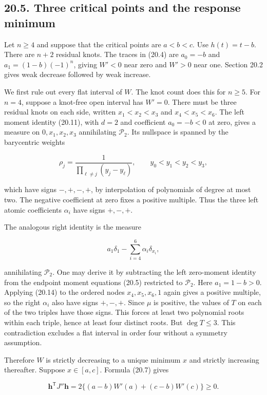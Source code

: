 \documentclass[11pt]{article}
\begin{document}
\subsection{20.5. Three critical points and the response
minimum}\label{three-critical-points-and-the-response-minimum}

Let \(n\ge4\) and suppose that the critical points are \(a<b<c\). Use
\(h(t)=t-b\). There are \(n+2\) residual knots. The traces in (20.4) are
\(a_0=-b\) and \(a_1=(1-b)(-1)^n\), giving \(W'<0\) near zero and
\(W'>0\) near one. Section 20.2 gives weak decrease followed by weak
increase.

We first rule out every flat interval of \(W\). The knot count does this
for \(n\ge5\). For \(n=4\), suppose a knot-free open interval has
\(W'=0\). There must be three residual knots on each side, written
\(x_1<x_2<x_3\) and \(x_4<x_5<x_6\). The left moment identity (20.11),
with \(d=2\) and coefficient \(a_0=-b<0\) at zero, gives a measure on
\(0,x_1,x_2,x_3\) annihilating \(\mathcal P_2\). Its nullspace is
spanned by the barycentric weights

\[
\rho_j=\frac1{\prod_{\ell\ne j}(y_j-y_\ell)},
\qquad y_0<y_1<y_2<y_3,
\tag{20.14}
\]

which have signs \(-,+,-,+\), by interpolation of polynomials of degree
at most two. The negative coefficient at zero fixes a positive multiple.
Thus the three left atomic coefficients \(\alpha_i\) have signs
\(+,-,+\).

The analogous right identity is the measure

\[
a_1\delta_1-\sum_{i=4}^6\alpha_i\delta_{x_i},
\tag{20.15}
\]

annihilating \(\mathcal P_2\). One may derive it by subtracting the left
zero-moment identity from the endpoint moment equations (20.5)
restricted to \(\mathcal P_2\). Here \(a_1=1-b>0\). Applying (20.14) to
the ordered nodes \(x_4,x_5,x_6,1\) again gives a positive multiple, so
the right \(\alpha_i\) also have signs \(+,-,+\). Since \(\mu\) is
positive, the values of \(T\) on each of the two triples have those
signs. This forces at least two polynomial roots within each triple,
hence at least four distinct roots. But \(\deg T\le3\). This
contradiction excludes a flat interval in order four without a symmetry
assumption.

Therefore \(W\) is strictly decreasing to a unique minimum \(x\) and
strictly increasing thereafter. Suppose \(x\in[a,c]\). Formula (20.7)
gives

\[
\mathbf h^{\mathsf T}J''\mathbf h
=2\{(a-b)W'(a)+(c-b)W'(c)\}\ge0.
\tag{20.16}
\]
\end{document}
